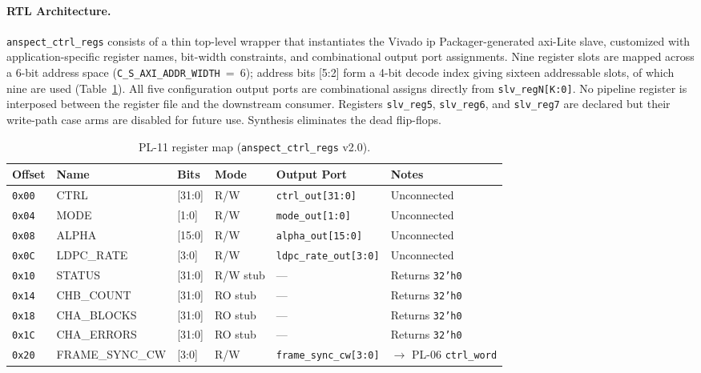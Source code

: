 
\FloatBarrier
\paragraph{RTL Architecture.}

\texttt{anspect\_ctrl\_regs} consists of a thin top-level wrapper
that instantiates the Vivado \ac{ip} Packager-generated \ac{axi}-Lite slave,
customized with application-specific register names, bit-width
constraints, and combinational output port assignments.
Nine register slots are mapped across a 6-bit address space
(\texttt{C\_S\_AXI\_ADDR\_WIDTH}~=~6); address bits [5:2] form a
4-bit decode index giving sixteen addressable slots, of which nine
are used (Table~\ref{tab:regmap_pl11}).
All five configuration output ports are combinational assigns directly
from \texttt{slv\_regN[K:0]}.
No pipeline register is interposed between the register file and the
downstream consumer.
Registers \texttt{slv\_reg5}, \texttt{slv\_reg6}, and
\texttt{slv\_reg7} are declared but their write-path case arms are
disabled for future use.
Synthesis eliminates the dead flip-flops.

\leavevmode\par
\begin{table}[!h]
  \caption{PL-11 register map (\texttt{anspect\_ctrl\_regs} v2.0).}
  \label{tab:regmap_pl11}
  \centering
  \small
  \begin{tabular}{l l l l p{3.6cm} p{2.6cm}}
    \hline
    Offset & Name & Bits & Mode & Output Port & Notes \\
    \hline
    \texttt{0x00} & CTRL           & [31:0] & R/W      & \texttt{ctrl\_out[31:0]}
      & Unconnected \\
    \texttt{0x04} & MODE           & [1:0]  & R/W      & \texttt{mode\_out[1:0]}
      & Unconnected \\
    \texttt{0x08} & ALPHA          & [15:0] & R/W      & \texttt{alpha\_out[15:0]}
      & Unconnected \\
    \texttt{0x0C} & LDPC\_RATE     & [3:0]  & R/W      & \texttt{ldpc\_rate\_out[3:0]}
      & Unconnected \\
    \texttt{0x10} & STATUS         & [31:0] & R/W stub & —
      & Returns \texttt{32'h0} \\
    \texttt{0x14} & CHB\_COUNT     & [31:0] & RO stub  & —
      & Returns \texttt{32'h0} \\
    \texttt{0x18} & CHA\_BLOCKS    & [31:0] & RO stub  & —
      & Returns \texttt{32'h0} \\
    \texttt{0x1C} & CHA\_ERRORS    & [31:0] & RO stub  & —
      & Returns \texttt{32'h0} \\
    \texttt{0x20} & FRAME\_SYNC\_CW & [3:0] & R/W      & \texttt{frame\_sync\_cw[3:0]}
      & $\rightarrow$ PL-06 \texttt{ctrl\_word} \\
    \hline
  \end{tabular}
\end{table}
\FloatBarrier

